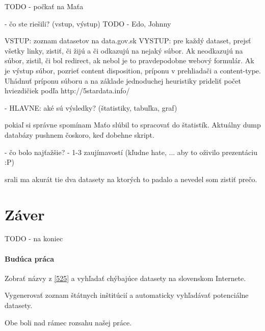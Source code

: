 \documentclass[12pt,a4paper]{article}
\begin{document}
TODO - počkať na Maťa 



  - čo ste riešili? (vstup, výstup)
TODO - Edo, Johnny 

VSTUP: zoznam datasetov na data.gov.sk
VYSTUP: pre každý dataset, prejsť všetky linky, zistiť, či žijú a či odkazujú na nejaký súbor.
      Ak neodkazujú na súbor, zistil, či bol redirect, ak nebol je to pravdepodobne webový formulár. 
      Ak je výstup súbor, pozrieť content disposition, príponu v prehliadači a content-type. Uhádnuť príponu súboru a na základe 
       jednoduchej heuristiky prideliť počet hviezdičiek podľa http://5stardata.info/

  - HLAVNE: aké sú výsledky? (štatistiky, tabuľka, graf) 

pokiaľ si správne spomínam Maťo slúbil to spracovať do štatistík. 
Aktuálny dump databázy pushnem čoskoro, keď dobehne skript.


  - čo bolo najťažšie? 
  - 1-3 zaujímavostí (kľudne hate, ... aby to oživilo prezentáciu :P)

srali ma akurát tie dva datasety na ktorých to padalo a nevedel som zistiť prečo.



\section{Záver} 

TODO - na koniec 

\paragraph{Budúca práca} 

Zobrať názvy z \ref{525} a vyhľadať chýbajúce datasety na slovenskom Internete. 

Vygenerovať zoznam štátnych inštitúcií a automaticky vyhľadávať potenciálne datasety.

Obe boli nad rámec rozsahu našej práce. 
\end{document}
